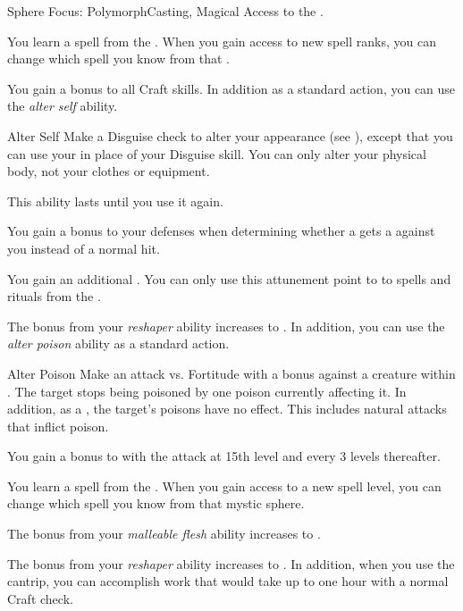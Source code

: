     \begin{feat}{Sphere Focus: Polymorph}{Casting, Magical}
        \featpre Access to the  .

         You learn a spell from the  .
        When you gain access to new spell ranks, you can change which spell you know from that .

         You gain a  bonus to all Craft skills.
        In addition as a standard action, you can use the \textit{alter self} ability.
        \begin{freeability}{Alter Self}
            Make a Disguise check to alter your appearance (see ), except that you can use your  in place of your Disguise skill.
            You can only alter your physical body, not your clothes or equipment.

            This ability lasts until you use it again.
        \end{freeability}

         You gain a  bonus to your defenses when determining whether a  gets a  against you instead of a normal hit.

         You gain an additional .
        You can only use this attunement point to  to spells and rituals from the  .

         The bonus from your \textit{reshaper} ability increases to .
        In addition, you can use the \textit{alter poison} ability as a standard action.
        \begin{freeability}{Alter Poison}
            Make an attack vs. Fortitude with a   bonus against a creature within \shortrange.
            \hit The target stops being poisoned by one poison currently affecting it.
            In addition, as a , the target's  poisons have no effect.
            This includes natural attacks that inflict poison.

            \rankline
            You gain a  bonus to  with the attack at 15th level and every 3 levels thereafter.
        \end{freeability}

         You learn a spell from the  .
        When you gain access to a new spell level, you can change which spell you know from that mystic sphere.

         The bonus from your \textit{malleable flesh} ability increases to .

         The bonus from your \textit{reshaper} ability increases to .
        In addition, when you use the  cantrip, you can accomplish work that would take up to one hour with a normal Craft check.
    \end{feat}

